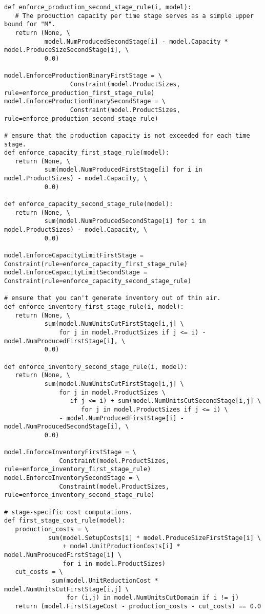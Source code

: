 {\begin{verbatim}
def enforce_production_second_stage_rule(i, model):
   # The production capacity per time stage serves as a simple upper bound for "M".   
   return (None, \
           model.NumProducedSecondStage[i] - model.Capacity * model.ProduceSizeSecondStage[i], \
           0.0)

model.EnforceProductionBinaryFirstStage = \
                  Constraint(model.ProductSizes, rule=enforce_production_first_stage_rule)
model.EnforceProductionBinarySecondStage = \
                  Constraint(model.ProductSizes, rule=enforce_production_second_stage_rule)

# ensure that the production capacity is not exceeded for each time stage.
def enforce_capacity_first_stage_rule(model):
   return (None, \
           sum(model.NumProducedFirstStage[i] for i in model.ProductSizes) - model.Capacity, \
           0.0)

def enforce_capacity_second_stage_rule(model):
   return (None, \
           sum(model.NumProducedSecondStage[i] for i in model.ProductSizes) - model.Capacity, \
           0.0)    

model.EnforceCapacityLimitFirstStage = Constraint(rule=enforce_capacity_first_stage_rule)
model.EnforceCapacityLimitSecondStage = Constraint(rule=enforce_capacity_second_stage_rule)

# ensure that you can't generate inventory out of thin air.
def enforce_inventory_first_stage_rule(i, model):
   return (None, \
           sum(model.NumUnitsCutFirstStage[i,j] \
               for j in model.ProductSizes if j <= i) - model.NumProducedFirstStage[i], \
           0.0)

def enforce_inventory_second_stage_rule(i, model):
   return (None, \
           sum(model.NumUnitsCutFirstStage[i,j] \
               for j in model.ProductSizes \
                  if j <= i) + sum(model.NumUnitsCutSecondStage[i,j] \
                     for j in model.ProductSizes if j <= i) \
               - model.NumProducedFirstStage[i] - model.NumProducedSecondStage[i], \
           0.0)

model.EnforceInventoryFirstStage = \
               Constraint(model.ProductSizes, rule=enforce_inventory_first_stage_rule)
model.EnforceInventorySecondStage = \
               Constraint(model.ProductSizes, rule=enforce_inventory_second_stage_rule)

# stage-specific cost computations.
def first_stage_cost_rule(model):
   production_costs = \
            sum(model.SetupCosts[i] * model.ProduceSizeFirstStage[i] \
                + model.UnitProductionCosts[i] * model.NumProducedFirstStage[i] \
                for i in model.ProductSizes)
   cut_costs = \
             sum(model.UnitReductionCost * model.NumUnitsCutFirstStage[i,j] \
                 for (i,j) in model.NumUnitsCutDomain if i != j)
   return (model.FirstStageCost - production_costs - cut_costs) == 0.0


\end{verbatim}}
